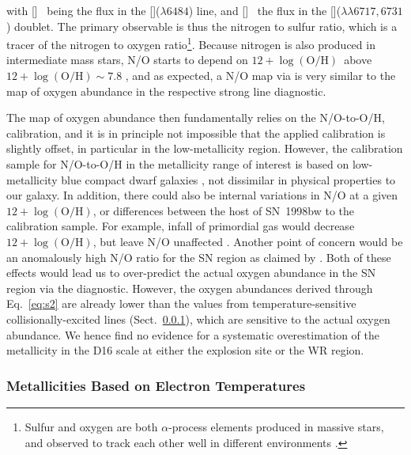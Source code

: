 \documentclass[traditabstract, referee]{aa}
\newcommand{\oh}{12+\log(\mathrm{O/H})}
\newcommand{\sii}{[\ion{S}{ii}]}
\newcommand{\nii}{[\ion{N}{ii}]}
\begin{document}
with \nii~ being the flux in the \nii($\lambda6484$) line, and \sii~ the flux in the \sii($\lambda\lambda6717,6731$) doublet. The primary observable is thus the nitrogen to sulfur ratio, which is a tracer of the nitrogen to oxygen ratio\footnote{Sulfur and oxygen are both $\alpha$-process elements produced in massive stars, and observed to track each other well in different environments \citep[see e.g. Fig. 6 in][]{2006A&A...448..955I}.}. Because nitrogen is also produced in intermediate mass stars, N/O starts to depend on $\oh$~above $\oh\sim 7.8$ \citep[e.g.][]{1999ApJ...511..639I, 2013A&A...549A..25P, 2016A&A...595A..62P}, and as expected, a N/O map via \citet{2010ApJ...715L.128A} is very similar to the map of oxygen abundance in the respective strong line diagnostic.

The map of oxygen abundance then fundamentally relies on the N/O-to-O/H, calibration, and it is in principle not impossible that the applied calibration is slightly offset, in particular in the low-metallicity region. However, the calibration sample for N/O-to-O/H in the metallicity range of interest is based on low-metallicity blue compact dwarf galaxies \citep{1999ApJ...511..639I}, not dissimilar in physical properties to our {galaxy}. In addition, there could also be internal variations in N/O at a given $\oh$, or differences between the host of SN~1998bw to the calibration sample. For example, infall of primordial gas \citep[e.g.,][]{2015A&A...582A..78M} would decrease $\oh$, but leave N/O unaffected \citep{2016ApJ...823L..24K}. Another point of concern would be an anomalously high N/O ratio for the SN region as claimed by \citet{2006A&A...454..103H}. Both of these effects would lead us to over-predict the actual oxygen abundance in the SN region via the \citet{2016Ap&SS.361...61D} diagnostic. {However, the oxygen abundances derived through Eq.~\ref{eq:s2} are already lower than the values from temperature-sensitive collisionally-excited lines (Sect.~\ref{teoh}), which are sensitive to the actual oxygen abundance. We hence find no evidence for a systematic overestimation of the metallicity in the D16 scale at either the explosion site or the WR region.}


\subsubsection{Metallicities Based on Electron Temperatures}
\label{teoh}
\end{document}

